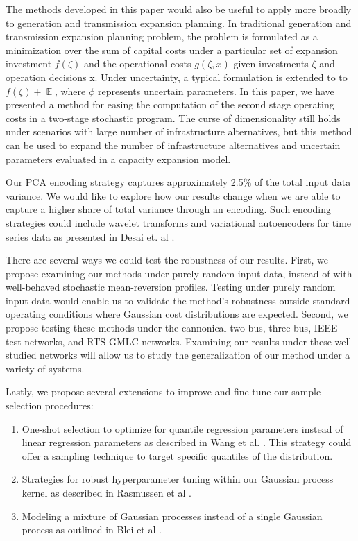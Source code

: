 \documentclass[10pt,twocolumn,letterpaper]{article}
\begin{document}
The methods developed in this paper would also be useful to apply more broadly to generation and transmission expansion planning. In traditional generation and transmission expansion planning problem, the problem is formulated as a minimization over the sum of capital costs under a particular set of expansion investment $f(\zeta)$  and the operational costs $g(\zeta,x)$ given investments $\zeta$  and operation decisions x. Under uncertainty, a typical formulation is extended to to $f(\zeta) + \mathop{{}\mathbb{E}[g(\zeta,x,\phi)]}$, where $\phi$ represents uncertain parameters. In this paper, we have presented a method for easing the computation of the second stage operating costs in a two-stage stochastic program. The curse of dimensionality still holds under scenarios with large number of infrastructure alternatives, but this method can be used to expand the number of infrastructure alternatives and uncertain parameters evaluated in a capacity expansion model.

Our PCA encoding strategy captures approximately 2.5\% of the total input data variance. We would like to explore how our results change when we are able to capture a higher share of total variance through an encoding. Such encoding strategies could include wavelet transforms and variational autoencoders for time series data as presented in Desai et. al \cite{desai2021timevae}.

There are several ways we could test the robustness of our results. First, we propose examining our methods under purely random input data, instead of with well-behaved stochastic mean-reversion profiles. Testing under purely random input data would enable us to validate the method's robustness outside standard operating conditions where Gaussian cost distributions are expected. Second, we propose testing these methods under the cannonical two-bus, three-bus, IEEE test networks, and RTS-GMLC networks. Examining our results under these well studied networks will allow us to study the generalization of our method under a variety of systems. 

Lastly, we propose several extensions to improve and fine tune our sample selection procedures:
\begin{enumerate}
        \item One-shot selection to optimize for quantile regression parameters instead of linear regression parameters as described in Wang et al. \cite{wang2020optimal}. This strategy could offer a sampling technique to target specific quantiles of the distribution.
        \item Strategies for robust hyperparameter tuning within our Gaussian process kernel as described in Rasmussen et al \cite{Rasmussen}.
        \item Modeling a mixture of Gaussian processes instead of a single Gaussian process as outlined in Blei et al \cite{Blei_2017}.
\end{enumerate}
\end{document}
